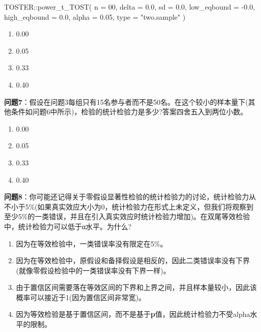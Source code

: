 \documentclass[
  letterpaper,
  DIV=11,
  numbers=noendperiod]{scrreprt}
\newenvironment{Shaded}{\begin{snugshade}}{\end{snugshade}}
\newcommand{\AttributeTok}[1]{\textcolor[rgb]{0.40,0.45,0.13}{#1}}
\newcommand{\DecValTok}[1]{\textcolor[rgb]{0.68,0.00,0.00}{#1}}
\newcommand{\FloatTok}[1]{\textcolor[rgb]{0.68,0.00,0.00}{#1}}
\newcommand{\FunctionTok}[1]{\textcolor[rgb]{0.28,0.35,0.67}{#1}}
\newcommand{\NormalTok}[1]{\textcolor[rgb]{0.00,0.23,0.31}{#1}}
\newcommand{\SpecialCharTok}[1]{\textcolor[rgb]{0.37,0.37,0.37}{#1}}
\newcommand{\StringTok}[1]{\textcolor[rgb]{0.13,0.47,0.30}{#1}}
\providecommand{\tightlist}{%
  \setlength{\itemsep}{0pt}\setlength{\parskip}{0pt}}\usepackage{longtable,booktabs,array}
\begin{document}
\begin{Shaded}
\begin{Highlighting}[]
\NormalTok{TOSTER}\SpecialCharTok{::}\FunctionTok{power\_t\_TOST}\NormalTok{(}
  \AttributeTok{n =} \DecValTok{00}\NormalTok{,}
  \AttributeTok{delta =} \FloatTok{0.0}\NormalTok{,}
  \AttributeTok{sd =} \FloatTok{0.0}\NormalTok{,}
  \AttributeTok{low\_eqbound =} \SpecialCharTok{{-}}\FloatTok{0.0}\NormalTok{,}
  \AttributeTok{high\_eqbound =} \FloatTok{0.0}\NormalTok{,}
  \AttributeTok{alpha =} \FloatTok{0.05}\NormalTok{,}
  \AttributeTok{type =} \StringTok{"two.sample"}
\NormalTok{)}
\end{Highlighting}
\end{Shaded}

\begin{enumerate}
\def\labelenumi{\Alph{enumi})}
\tightlist
\item
  0.00
\item
  0.05
\item
  0.33
\item
  0.40
\end{enumerate}

\textbf{问题7}：假设在问题3每组只有15名参与者而不是50名。在这个较小的样本量下(其他条件如问题6中所示)，检验的统计检验力是多少?答案四舍五入到两位小数。

\begin{enumerate}
\def\labelenumi{\Alph{enumi})}
\tightlist
\item
  0.00
\item
  0.05
\item
  0.33
\item
  0.40
\end{enumerate}

\textbf{问题8}：你可能还记得关于零假设显著性检验的统计检验力的讨论，统计检验力从不小于5\%(如果真实效应大小为0，统计检验力在形式上未定义，但我们将观察到至少5\%的一类错误，并且在引入真实效应时统计检验力增加)。在双尾等效检验中，统计检验力可以低于α水平。为什么?

\begin{enumerate}
\def\labelenumi{\Alph{enumi})}
\tightlist
\item
  因为在等效检验中，一类错误率没有限定在5\%。
\item
  因为在等效检验中，原假设和备择假设是相反的，因此二类错误率没有下界(就像零假设检验中的一类错误率没有下界一样)。
\item
  由于置信区间需要落在等效区间的下界和上界之间，并且样本量较小，因此该概率可以接近于1(因为置信区间非常宽)。
\item
  因为等效检验是基于置信区间，而不是基于\textbf{p}值，因此统计检验力不受alpha水平的限制。
\end{enumerate}
\end{document}
